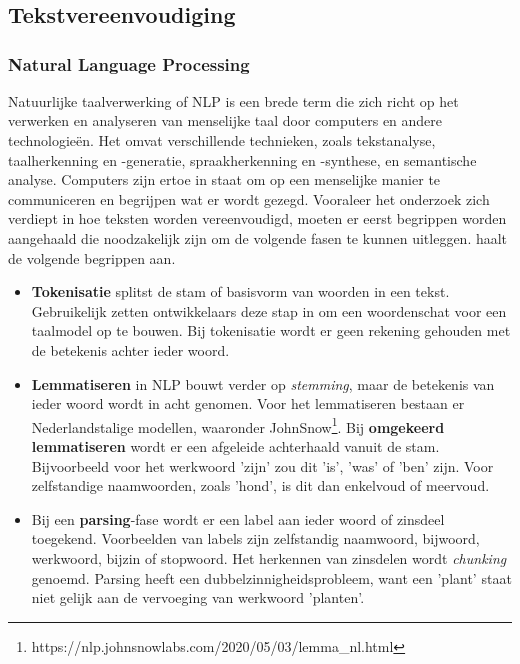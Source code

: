 \chapter{}%
\label{ch:stand-van-zaken}

\section{Tekstvereenvoudiging}

\subsection{Natural Language Processing}

Natuurlijke taalverwerking of NLP is een brede term die zich richt op het verwerken en analyseren van menselijke taal door computers en andere technologieën. Het omvat verschillende technieken, zoals tekstanalyse, taalherkenning en -generatie, spraakherkenning en -synthese, en semantische analyse. Computers zijn ertoe in staat om op een menselijke manier te communiceren en begrijpen wat er wordt gezegd. Vooraleer het onderzoek zich verdiept in hoe teksten worden vereenvoudigd, moeten er eerst begrippen worden aangehaald die noodzakelijk zijn om de volgende fasen te kunnen uitleggen. \textcite{Sohom2019} haalt de volgende begrippen aan.

\begin{itemize}
	\item \textbf{Tokenisatie} splitst de stam of basisvorm van woorden in een tekst. Gebruikelijk zetten ontwikkelaars deze stap in om een woordenschat voor een taalmodel op te bouwen. Bij tokenisatie wordt er geen rekening gehouden met de betekenis achter ieder woord.
	\item \textbf{Lemmatiseren} in NLP bouwt verder op \textit{stemming}, maar de betekenis van ieder woord wordt in acht genomen. Voor het lemmatiseren bestaan er Nederlandstalige modellen, waaronder JohnSnow\footnote{https://nlp.johnsnowlabs.com/2020/05/03/lemma\_nl.html}. Bij \textbf{omgekeerd lemmatiseren} wordt er een afgeleide achterhaald vanuit de stam. Bijvoorbeeld voor het werkwoord 'zijn' zou dit 'is', 'was' of 'ben' zijn. Voor zelfstandige naamwoorden, zoals 'hond', is dit dan enkelvoud of meervoud.
	\item Bij een \textbf{parsing}-fase wordt er een label aan ieder woord of zinsdeel toegekend. Voorbeelden van labels zijn zelfstandig naamwoord, bijwoord, werkwoord, bijzin of stopwoord. Het herkennen van zinsdelen wordt \textit{chunking} genoemd. Parsing heeft een dubbelzinnigheidsprobleem, want een 'plant' staat niet gelijk aan de vervoeging van werkwoord 'planten'.
\end{itemize}



